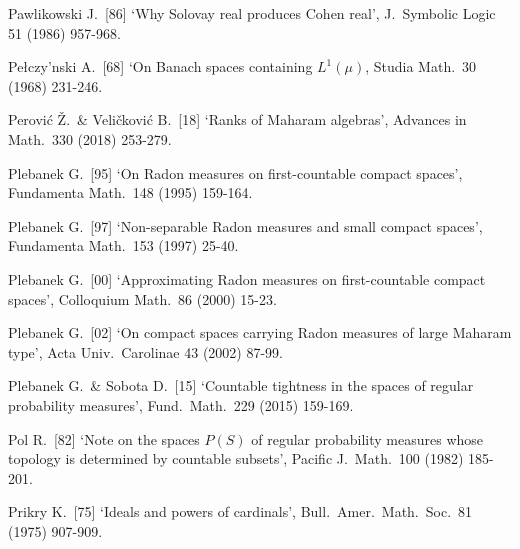 {\medskip%


Pawlikowski J.\ [86] `Why Solovay real produces Cohen real',
J.\ Symbolic Logic 51 (1986) 957-968.
\cmmnt{[552G, 552H.]}


Pe{\l}czy'nski A.\ [68] `On Banach spaces containing $L^1(\mu)$, Studia
Math.\ 30 (1968) 231-246.
\cmmnt{[531Ye.]}

Perovi\'c \v{Z}.\ \& Veli\v{c}kovi\'c B.\ [18] `Ranks of Maharam algebras',
Advances in Math.\ 330 (2018) 253-279.
\cmmnt{[539V.]}





Plebanek G.\ [95] `On Radon measures on first-countable compact spaces',
Fundamenta Math.\ 148 (1995) 159-164.
\cmmnt{[531O.]}

Plebanek G.\ [97] `Non-separable Radon measures and small compact
spaces', Fundamenta Math.\ 153 (1997) 25-40.
\cmmnt{[531L, 531M, 531V.]}

Plebanek G.\ [00]
`Approximating Radon measures on first-countable compact spaces',
Colloquium Math.\ 86 (2000) 15-23.
\cmmnt{[533H, 533Yc.]}

Plebanek G.\ [02]
`On compact spaces carrying Radon measures of large Maharam type',
Acta Univ.\ Carolinae 43 (2002) 87-99.
\cmmnt{[531U.]}

Plebanek G.\ \& Sobota D.\ [15] `Countable tightness in the spaces of
regular probability measures', Fund.\ Math.\ 229 (2015) 159-169.
\cmmnt{[531U.]}


Pol R.\ [82] `Note on the spaces $P(S)$ of regular probability measures
whose topology is determined by countable subsets', Pacific J.\ Math.\
100 (1982) 185-201.
\cmmnt{[533Ya.]}


Prikry K.\ [75] `Ideals and powers of cardinals', Bull.\
Amer.\ Math.\ Soc.\ 81 (1975) 907-909.
\cmmnt{[555N.]}

\medskip%

}
